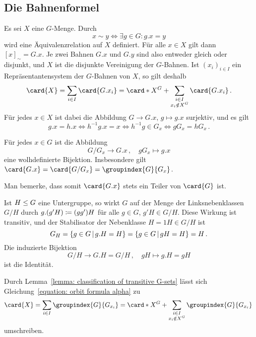 \subsection{Die Bahnenformel}

Es sei $X$ eine $G$-Menge.
Durch
\[
        x \sim y
  \iff  \exists g \in G: g.x = y
\]
wird eine Äquivalenzrelation auf $X$ definiert.
Für alle $x \in X$ gilt dann $[x]_{\sim} = G.x$.
Je zwei Bahnen $G.x$ und $G.y$ sind also entweder gleich oder disjunkt, und $X$ ist die disjunkte Vereinigung der $G$-Bahnen.
Ist $(x_i)_{i \in I}$ ein Repräsentantensystem der $G$-Bahnen von $X$, so gilt deshalb
\begin{equation}
\label{equation: orbit formula alpha}
    \card{X}
  = \sum_{i \in I} \card{G.x_i}
  = \card*{X^G} + \sum_{\substack{i \in I \\ x_i \notin X^G}} \card{G.x_i} \,.
\end{equation}
Für jedes $x \in X$ ist dabei die Abbildung $G \to G.x$, $g \mapsto g.x$ surjektiv, und es gilt
\[
        g.x = h.x
  \iff  h^{-1}g.x = x
  \iff  h^{-1} g \in G_x
  \iff  g G_x = h G_x \,.
\]

\begin{lemma}
  \label{lemma: classification of transitive G-sets}
  Für jedes $x \in G$ ist die Abbildung
  \[
            G/G_x
    \to     G.x \,,
    \quad   g G_x
    \mapsto g.x
  \]
  eine wolhdefinierte Bijektion.
  Insbesondere gilt $\card{G.x} = \card{G/G_x} = \groupindex{G}{G_x}$.
\end{lemma}

\begin{remark}
  Man bemerke, dass somit $\card{G.x}$ stets ein Teiler von $\card{G}$ ist.
\end{remark}

\begin{example}
  Ist $H \mathrel{\leq} G$ eine Untergruppe, so wirkt $G$ auf der Menge der Linksnebenklassen $G/H$ durch $g.(g'H) \coloneqq (gg')H$ für alle $g \in G$, $g'H \in G/H$.
  Diese Wirkung ist transitiv, und der Stabilisator der Nebenklasse $H = 1H \in G/H$ ist
  \[
      G_H
    = \{ g \in G \suchthat g.H = H \}
    = \{ g \in G \suchthat gH = H \}
    = H \,.
  \]
  Die induzierte Bijektion
  \[
            G/H
    \to     G.H
    =       G/H \,,
    \quad   gH
    \mapsto g.H
    =       gH
  \]
  ist die Identität.
\end{example}

Durch Lemma~\ref{lemma: classification of transitive G-sets} lässt sich Gleichung~\eqref{equation: orbit formula alpha} zu
\[
    \card{X}
  = \sum_{i \in I} \groupindex{G}{G_{x_i}}
  = \card*{X^G} + \sum_{\substack{i \in I \\ x_i \notin X^G}} \groupindex{G}{G_{x_i}} \,
\]
umschreiben.

